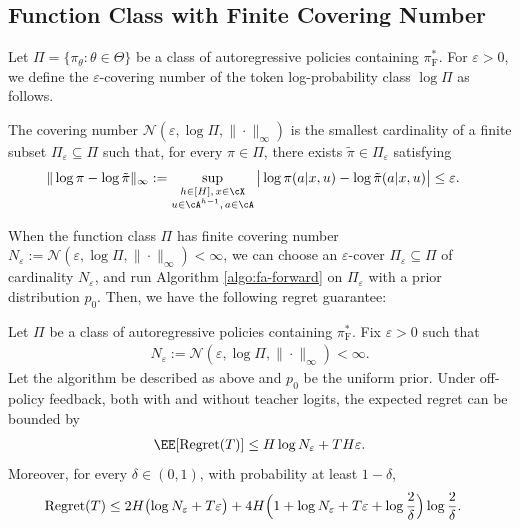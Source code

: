 \documentclass[11pt]{article}
\newcommand{\pif}{\pi_{\mathrm{F}}}
\begin{document}
\subsection{Function Class with Finite Covering Number}
Let $\Pi=\{\pi_\theta:\theta\in\Theta\}$ be a class of
autoregressive policies containing $\pif^*$.
For $\varepsilon>0$, we define the $\varepsilon$-covering number
of the token log-probability class $\log\Pi$ as follows.

\begin{definition}
\label{def:log-policy-covering}
The covering number
$\mathcal N(\varepsilon,\log\Pi,\|\cdot\|_\infty)$
is the smallest cardinality of a finite subset
$\Pi_\varepsilon\subseteq\Pi$ such that, for every $\pi\in\Pi$,
there exists $\tilde\pi\in\Pi_\varepsilon$ satisfying
\begin{align*}
    \|\log\pi-\log\tilde\pi\|_\infty
    &:=
    \sup_{\substack{
        h\in[H],\,x\in\cX\\
        u\in\cA^{h-1},\,a\in\cA
    }}
    \big|
        \log\pi(a|x,u)
        -
        \log\tilde\pi(a|x,u)
    \big|
    \leq\varepsilon.
\end{align*}
\end{definition}
When the function class $\Pi$ has finite covering number $N_\varepsilon:=\mathcal N(\varepsilon,\log\Pi,\|\cdot\|_\infty)<\infty$, we can choose an $\varepsilon$-cover $\Pi_\varepsilon\subseteq\Pi$
of cardinality $N_\varepsilon$, and run Algorithm \ref{algo:fa-forward} on $\Pi_\varepsilon$ with a prior distribution $p_0$. Then, we have the following regret guarantee:
\begin{theorem}
\label{thm:fa-forward-covering}
Let $\Pi$ be a class of autoregressive policies containing
$\pif^*$. Fix $\varepsilon>0$ such that
\begin{align*}
    N_\varepsilon
    :=
    \mathcal N(\varepsilon,\log\Pi,\|\cdot\|_\infty)
    <\infty.
\end{align*}
Let the algorithm be described as above and $p_0$ be the uniform prior. Under off-policy feedback, both with and without teacher logits, the expected regret can be bounded by
\begin{align}
    \EE[\operatorname{Regret}(T)]
    \leq
    H\log N_\varepsilon+TH\varepsilon.
    \notag
\end{align}
Moreover, for every $\delta\in(0,1)$, with probability at least
$1-\delta$,
\begin{align}
    \operatorname{Regret}(T)
    &\leq
    2H\bigl(\log N_\varepsilon+T\varepsilon\bigr)
    \notag+
    4H\Big(
        1+\log N_\varepsilon+T\varepsilon
        +\log\frac2\delta
    \Big)\log\frac2\delta.
\end{align}
\end{theorem}
\end{document}
